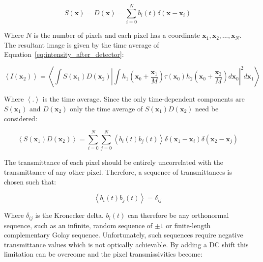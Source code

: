 \begin{equation}\label{eq:detector_aperture_time}
S\left(\textbf{x}\right) = D\left(\textbf{x}\right) = \sum_{i=0}^{N} b_{i}\left(t\right)\delta\left(\textbf{x} - \textbf{x}_{i}\right)
\end{equation}

Where $N$ is the number of pixels and each pixel has a 
coordinate $\textbf{x}_{1}, \textbf{x}_{2},...,\textbf{x}_{N}$. 
The resultant image is given by the time average of 
Equation~\ref{eq:intensity_after_detector}:

\begin{equation}\label{eq:confocal_image_time_ave}
\left\langle I\left(\textbf{x}_{2}\right)\right\rangle = \left\langle \int S\left(\textbf{x}_{1}\right) D\left(\textbf{x}_{2}\right) \left| \int h_{1}\left(\textbf{x}_{0} + \frac{\textbf{x}_{1}}{M}\right) \tau\left(\textbf{x}_{0}\right) h_{2}\left(\textbf{x}_{0} + \frac{\textbf{x}_{2}}{M}\right)d\textbf{x}_{0}\right|^{2}d\textbf{x}_{1}\right\rangle
\end{equation}

Where $\left\langle . \right\rangle$ is the time average. 
Since the only time-dependent components are 
$S\left(\textbf{x}_{1}\right)$ and $D\left(\textbf{x}_{2}\right)$ 
only the time average of 
$S\left(\textbf{x}_{1}\right) D\left(\textbf{x}_{2}\right)$ 
need be considered:

\begin{equation}\label{eq:SD_time_ave}
\left\langle S\left(\textbf{x}_{1}\right) D\left(\textbf{x}_{2}\right)\right\rangle = \sum_{i=0}^{N}\sum_{j=0}^{N} \left\langle b_{i}\left(t\right) b_{j}\left(t\right)\right\rangle \delta\left(\textbf{x}_{1} - \textbf{x}_{i}\right) \delta\left(\textbf{x}_{2} - \textbf{x}_{j}\right)
\end{equation}

The transmittance of each pixel should be entirely 
uncorrelated with the transmittance of any other pixel. 
Therefore, a sequence of transmittances is chosen such that:

\begin{equation}\label{eq:pixel_uncorrelation}
\left\langle b_{i}\left(t\right) b_{j}\left(t\right)\right\rangle = \delta_{ij}
\end{equation}

Where $\delta_{ij}$ is the Kronecker delta. $b_{i}\left(t\right)$ 
can therefore be any orthonormal sequence, such as an infinite, 
random sequence of $\pm1$ or finite-length complementary Golay 
sequence\cite{golay1949multi}. Unfortunately, such sequences 
require negative transmittance values which is not optically 
achievable. By adding a DC shift this limitation can be overcome 
and the pixel transmissivities become:

